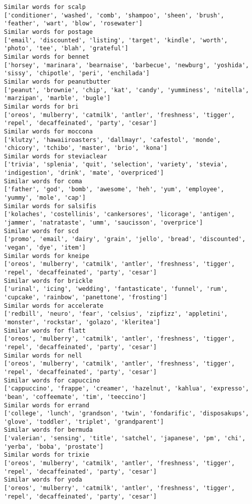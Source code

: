 \documentclass[11pt]{article}
\begin{document}
\begin{Verbatim}[commandchars=\\\{\}]
Similar words for scalp
['conditioner', 'washed', 'comb', 'shampoo', 'sheen', 'brush', 'feather', 'wart', 'blow', 'rosewater']
Similar words for postage
['email', 'discounted', 'listing', 'target', 'kindle', 'worth', 'photo', 'tee', 'blah', 'grateful']
Similar words for bennet
['horsey', 'marinara', 'bearnaise', 'barbecue', 'newburg', 'yoshida', 'sissy', 'chipotle', 'peri', 'enchilada']
Similar words for peanutbutter
['peanut', 'brownie', 'chip', 'kat', 'candy', 'yumminess', 'nitella', 'marzipan', 'marble', 'bugle']
Similar words for bri
['oreos', 'mulberry', 'catmilk', 'antler', 'freshness', 'tigger', 'repel', 'decaffeinated', 'party', 'cesar']
Similar words for moccona
['klutzy', 'hawaiiroasters', 'dallmayr', 'cafestol', 'monde', 'chicory', 'tchibo', 'master', 'brio', 'kona']
Similar words for steviaclear
['trivia', 'splenia', 'quit', 'selection', 'variety', 'stevia', 'indigestion', 'drink', 'mate', 'overpriced']
Similar words for coma
['father', 'god', 'bomb', 'awesome', 'heh', 'yum', 'employee', 'yummy', 'mole', 'cap']
Similar words for salsifis
['kolaches', 'costellinis', 'cankersores', 'licorage', 'antigen', 'jammer', 'natrataste', 'umm', 'saucisson', 'overprice']
Similar words for scd
['promo', 'email', 'dairy', 'grain', 'jello', 'bread', 'discounted', 'vegan', 'dye', 'item']
Similar words for kneipe
['oreos', 'mulberry', 'catmilk', 'antler', 'freshness', 'tigger', 'repel', 'decaffeinated', 'party', 'cesar']
Similar words for brickle
['urinal', 'icing', 'wedding', 'fantasticate', 'funnel', 'rum', 'cupcake', 'rainbow', 'panettone', 'frosting']
Similar words for accelerate
['redbill', 'neuro', 'fear', 'celsius', 'zipfizz', 'appletini', 'monster', 'rockstar', 'golazo', 'kleritea']
Similar words for flatt
['oreos', 'mulberry', 'catmilk', 'antler', 'freshness', 'tigger', 'repel', 'decaffeinated', 'party', 'cesar']
Similar words for nell
['oreos', 'mulberry', 'catmilk', 'antler', 'freshness', 'tigger', 'repel', 'decaffeinated', 'party', 'cesar']
Similar words for capuccino
['cappuccino', 'frappe', 'creamer', 'hazelnut', 'kahlua', 'expresso', 'bean', 'coffeemate', 'tim', 'teeccino']
Similar words for errand
['college', 'lunch', 'grandson', 'twin', 'fondarific', 'disposakups', 'glove', 'toddler', 'triplet', 'grandparent']
Similar words for bermuda
['valerian', 'sensing', 'title', 'satchel', 'japanese', 'pm', 'chi', 'yerba', 'boba', 'prostate']
Similar words for trixie
['oreos', 'mulberry', 'catmilk', 'antler', 'freshness', 'tigger', 'repel', 'decaffeinated', 'party', 'cesar']
Similar words for yoda
['oreos', 'mulberry', 'catmilk', 'antler', 'freshness', 'tigger', 'repel', 'decaffeinated', 'party', 'cesar']

\end{Verbatim}
\end{document}
